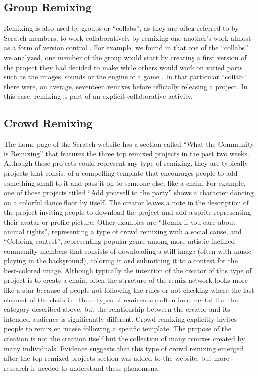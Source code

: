 \subsection{Group Remixing}
Remixing is also used by groups or ``collabs'', as they are often referred to by Scratch members, to work collaboratively by remixing one another's work almost as a form of version control \citep{tichy_rcs_1985}.
For example, we found in that one of the ``collabs'' we analyzed, one member of the group would start by creating a first version of the project they had decided to make while others would work on varied parts such as the images, sounds or the engine of a game \citep{aragon_tale_2009}.
In that particular ``collab'' there were, on average, seventeen remixes before officially releasing a project.
In this case, remixing is part of an explicit collaborative activity.


\subsection{Crowd Remixing}
The home page of the Scratch website has a section called ``What the Community is Remixing''  that features the three top remixed projects in the past two weeks.
Although these projects could represent any type of remixing, they are typically projects that consist of a compelling template that encourages people to add something small to it and pass it on to someone else, like a chain.
For example, one of those projects titled ``Add yourself to the party'' shows a character dancing on a colorful dance floor by itself.
The creator leaves a note in the description of the project inviting people to download the project and add a sprite representing their avatar or profile picture.
Other examples are ``Remix if you care about animal rights'', representing a type of crowd remixing with a social cause, and ``Coloring contest'', representing popular genre among more artistic-inclined community members that consists of downloading a still image (often with music playing in the background), coloring it and submitting it to a contest for the best-colored image.
Although typically the intention of the creator of this type of project is to create a chain, often the structure of the remix network looks more like a star because of people not following the rules or not checking where the last element of the chain is.
These types of remixes are often incremental like the category described above, but the relationship between the creator and its intended audience is significantly different. 
Crowd remixing explicitly invites people to remix en masse following a specific template. 
The purpose of the creation is not the creation itself but the collection of many remixes created by many individuals.
Evidence suggests that this type of crowd remixing emerged after the top remixed projects section was added to the website, but more research is needed to understand these phenomena.

